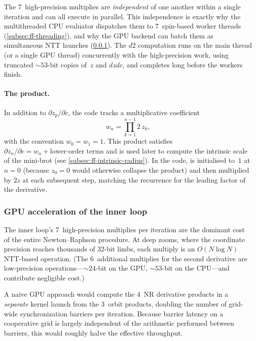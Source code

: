 \noindent
The 7~high-precision multiplies are \emph{independent} of one another
within a single iteration and can all execute in parallel.  This independence is
exactly why the multithreaded CPU evaluator dispatches them to
7~spin-based worker threads (\cref{subsec:ff-threading}), and why the
GPU backend can batch them as simultaneous NTT launches
(\cref{subsec:ff-inner-gpu}).  The $d2$ computation runs on the main
thread (or a single GPU thread) concurrently with the high-precision
work, using truncated ${\sim}53$-bit copies of~$z$ and $\mathit{dzdc}$,
and completes long before the  workers finish.

\paragraph{The  product.}
In addition to $\partial z_p/\partial c$, the code tracks a multiplicative
coefficient
\begin{equation}\label{eq:ff-zcoeff}
w_n = \prod_{k=1}^{n-1} 2\,z_k,
\end{equation}
with the convention $w_0 = w_1 = 1$.  This product satisfies
$\partial z_n/\partial c = w_n + \text{lower-order terms}$ and is used later
to compute the intrinsic scale of the mini-brot (see
\cref{subsec:ff-intrinsic-radius}).  In the code,  is
initialised to~$1$ at $n=0$ (because $z_0 = 0$ would otherwise collapse the
product) and then multiplied by $2z$ at each subsequent step, matching the
recurrence for the leading factor of the derivative.

\subsubsection{GPU acceleration of the inner loop}
\label{subsec:ff-inner-gpu}

The inner loop's 7~high-precision multiplies per iteration are the
dominant cost of the entire Newton--Raphson procedure.  At deep zooms,
where the coordinate precision reaches thousands of 32-bit limbs, each
multiply is an $O(N \log N)$ NTT-based operation.  (The 6~additional
multiplies for the second derivative are low-precision 
operations---${\sim}24$-bit on the GPU, ${\sim}53$-bit on the
CPU---and contribute negligible cost.)

A naive GPU approach would compute the 4~NR derivative products in a
\emph{separate} kernel launch from the 3~orbit products, doubling the
number of grid-wide synchronization barriers per iteration.  Because
barrier latency on a cooperative grid is largely independent of the
arithmetic performed between barriers, this would roughly halve the
effective throughput.


